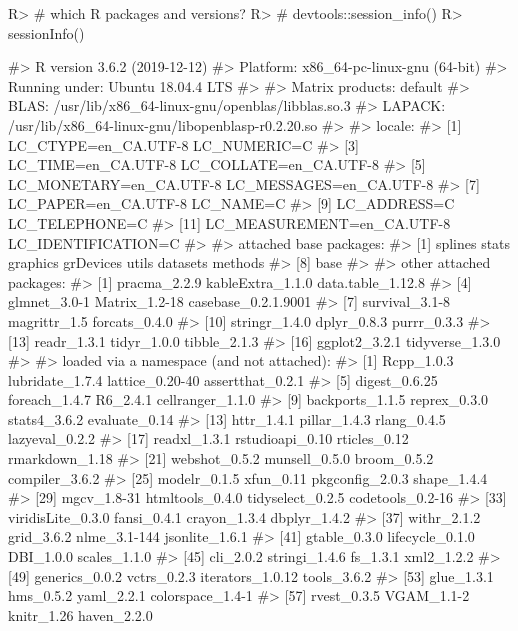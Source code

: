 \documentclass[
]{jss}
\begin{document}
\begin{CodeChunk}

\begin{CodeInput}
R> # which R packages and versions?
R> # devtools::session_info()
R> sessionInfo()
\end{CodeInput}

\begin{CodeOutput}
#> R version 3.6.2 (2019-12-12)
#> Platform: x86_64-pc-linux-gnu (64-bit)
#> Running under: Ubuntu 18.04.4 LTS
#> 
#> Matrix products: default
#> BLAS:   /usr/lib/x86_64-linux-gnu/openblas/libblas.so.3
#> LAPACK: /usr/lib/x86_64-linux-gnu/libopenblasp-r0.2.20.so
#> 
#> locale:
#>  [1] LC_CTYPE=en_CA.UTF-8       LC_NUMERIC=C              
#>  [3] LC_TIME=en_CA.UTF-8        LC_COLLATE=en_CA.UTF-8    
#>  [5] LC_MONETARY=en_CA.UTF-8    LC_MESSAGES=en_CA.UTF-8   
#>  [7] LC_PAPER=en_CA.UTF-8       LC_NAME=C                 
#>  [9] LC_ADDRESS=C               LC_TELEPHONE=C            
#> [11] LC_MEASUREMENT=en_CA.UTF-8 LC_IDENTIFICATION=C       
#> 
#> attached base packages:
#> [1] splines   stats     graphics  grDevices utils     datasets  methods  
#> [8] base     
#> 
#> other attached packages:
#>  [1] pracma_2.2.9        kableExtra_1.1.0    data.table_1.12.8  
#>  [4] glmnet_3.0-1        Matrix_1.2-18       casebase_0.2.1.9001
#>  [7] survival_3.1-8      magrittr_1.5        forcats_0.4.0      
#> [10] stringr_1.4.0       dplyr_0.8.3         purrr_0.3.3        
#> [13] readr_1.3.1         tidyr_1.0.0         tibble_2.1.3       
#> [16] ggplot2_3.2.1       tidyverse_1.3.0    
#> 
#> loaded via a namespace (and not attached):
#>  [1] Rcpp_1.0.3        lubridate_1.7.4   lattice_0.20-40   assertthat_0.2.1 
#>  [5] digest_0.6.25     foreach_1.4.7     R6_2.4.1          cellranger_1.1.0 
#>  [9] backports_1.1.5   reprex_0.3.0      stats4_3.6.2      evaluate_0.14    
#> [13] httr_1.4.1        pillar_1.4.3      rlang_0.4.5       lazyeval_0.2.2   
#> [17] readxl_1.3.1      rstudioapi_0.10   rticles_0.12      rmarkdown_1.18   
#> [21] webshot_0.5.2     munsell_0.5.0     broom_0.5.2       compiler_3.6.2   
#> [25] modelr_0.1.5      xfun_0.11         pkgconfig_2.0.3   shape_1.4.4      
#> [29] mgcv_1.8-31       htmltools_0.4.0   tidyselect_0.2.5  codetools_0.2-16 
#> [33] viridisLite_0.3.0 fansi_0.4.1       crayon_1.3.4      dbplyr_1.4.2     
#> [37] withr_2.1.2       grid_3.6.2        nlme_3.1-144      jsonlite_1.6.1   
#> [41] gtable_0.3.0      lifecycle_0.1.0   DBI_1.0.0         scales_1.1.0     
#> [45] cli_2.0.2         stringi_1.4.6     fs_1.3.1          xml2_1.2.2       
#> [49] generics_0.0.2    vctrs_0.2.3       iterators_1.0.12  tools_3.6.2      
#> [53] glue_1.3.1        hms_0.5.2         yaml_2.2.1        colorspace_1.4-1 
#> [57] rvest_0.3.5       VGAM_1.1-2        knitr_1.26        haven_2.2.0
\end{CodeOutput}
\end{CodeChunk}
\end{document}
